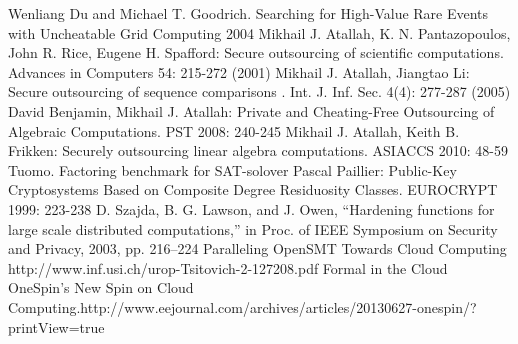 \documentclass[runningheads,a4paper]{llncs}
\begin{document}
\begin{thebibliography}{4}
	Wenliang Du and Michael T. Goodrich. Searching for High-Value Rare Events with Uncheatable Grid Computing  2004
	Mikhail J. Atallah, K. N. Pantazopoulos, John R. Rice, Eugene H. Spafford: Secure outsourcing of scientific computations. Advances in Computers 54: 215-272 (2001)
	Mikhail J. Atallah, Jiangtao Li: Secure outsourcing of sequence comparisons . Int. J. Inf. Sec. 4(4): 277-287 (2005)
	David Benjamin, Mikhail J. Atallah: Private and Cheating-Free Outsourcing of Algebraic Computations. PST 2008: 240-245
	Mikhail J. Atallah, Keith B. Frikken: Securely outsourcing linear algebra computations. ASIACCS 2010: 48-59
	Tuomo. Factoring benchmark for SAT-solover
	Pascal Paillier: Public-Key Cryptosystems Based on Composite Degree Residuosity Classes. EUROCRYPT 1999: 223-238
	D. Szajda, B. G. Lawson, and J. Owen, “Hardening functions for large scale distributed computations,” in Proc. of IEEE Symposium on Security and Privacy, 2003, pp. 216–224
	Paralleling OpenSMT Towards Cloud Computing http://www.inf.usi.ch/urop-Tsitovich-2-127208.pdf‎
	Formal in the Cloud OneSpin’s New Spin on Cloud Computing.http://www.eejournal.com/archives/articles/20130627-onespin/?printView=true

\end{thebibliography}
\end{document}
